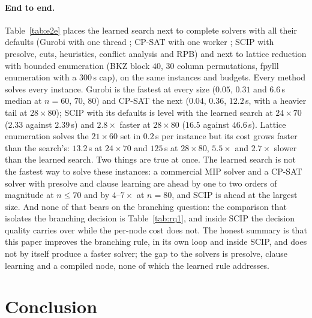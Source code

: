 \documentclass[final,5p,times,twocolumn,authoryear]{elsarticle}
\begin{document}
\paragraph{End to end.} Table~\ref{tab:e2e} places the learned search next to complete solvers with all their defaults (Gurobi with one thread \citep{gurobi2024}; CP-SAT with one worker \citep{perron2023ortools}; SCIP with presolve, cuts, heuristics, conflict analysis and RPB) and next to lattice reduction with bounded enumeration (BKZ block $40$, $30$ column permutations, fpylll enumeration \citep{fpylll2023} with a $300$\,s cap), on the same instances and budgets. Every method solves every instance. Gurobi is the fastest at every size ($0.05$, $0.31$ and $6.6$\,s median at $n=60$, $70$, $80$) and CP-SAT the next ($0.04$, $0.36$, $12.2$\,s, with a heavier tail at $28\times80$); SCIP with its defaults is level with the learned search at $24\times70$ ($2.33$ against $2.39$\,s) and $2.8\times$ faster at $28\times80$ ($16.5$ against $46.6$\,s). Lattice enumeration solves the $21\times60$ set in $0.2$\,s per instance but its cost grows faster than the search's: $13.2$\,s at $24\times70$ and $125$\,s at $28\times80$, $5.5\times$ and $2.7\times$ slower than the learned search.
Two things are true at once. The learned search is not the fastest way to solve these instances: a commercial MIP solver and a CP-SAT solver with presolve and clause learning are ahead by one to two orders of magnitude at $n\le70$ and by $4$--$7\times$ at $n=80$, and SCIP is ahead at the largest size. And none of that bears on the branching question: the comparison that isolates the branching decision is Table~\ref{tab:rq1}, and inside SCIP the decision quality carries over while the per-node cost does not. The honest summary is that this paper improves the branching rule, in its own loop and inside SCIP, and does not by itself produce a faster solver; the gap to the solvers is presolve, clause learning and a compiled node, none of which the learned rule addresses.

\section{Conclusion}
\label{sec:conclusion}
\end{document}
